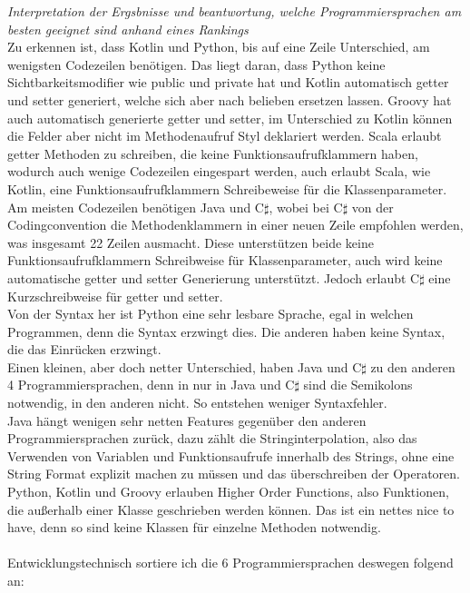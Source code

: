 \documentclass[ngerman]{article}
\begin{document}
    \textit{Interpretation der Ergsbnisse und beantwortung, welche Programmiersprachen am besten geeignet sind anhand eines Rankings}\\
    Zu erkennen ist, dass Kotlin und Python, bis auf eine Zeile Unterschied, am wenigsten Codezeilen benötigen. Das liegt daran, dass Python keine Sichtbarkeitsmodifier wie public und private hat und Kotlin automatisch getter und setter generiert, welche sich aber nach belieben ersetzen lassen. Groovy hat auch automatisch generierte getter und setter, im Unterschied zu Kotlin können die Felder aber nicht im Methodenaufruf Styl deklariert werden. Scala erlaubt getter Methoden zu schreiben, die keine Funktionsaufrufklammern haben, wodurch auch wenige Codezeilen eingespart werden, auch erlaubt Scala, wie Kotlin, eine Funktionsaufrufklammern Schreibeweise für die Klassenparameter. Am meisten Codezeilen benötigen Java und C$\sharp$, wobei bei C$\sharp$ von der Codingconvention die Methodenklammern in einer neuen Zeile empfohlen werden, was insgesamt 22 Zeilen ausmacht. Diese unterstützen beide keine Funktionsaufrufklammern Schreibweise für Klassenparameter, auch wird keine automatische getter und setter Generierung unterstützt. Jedoch erlaubt C$\sharp$ eine Kurzschreibweise für getter und setter.\\
    Von der Syntax her ist Python eine sehr lesbare Sprache, egal in welchen Programmen, denn die Syntax erzwingt dies. Die anderen haben keine Syntax, die das Einrücken erzwingt.\\
    Einen kleinen, aber doch netter Unterschied, haben Java und C$\sharp$ zu den anderen 4 Programmiersprachen, denn in nur in Java und C$\sharp$ sind die Semikolons notwendig, in den anderen nicht. So entstehen weniger Syntaxfehler.\\
    Java hängt wenigen sehr netten Features gegenüber den anderen Programmiersprachen zurück, dazu zählt die Stringinterpolation, also das Verwenden von Variablen und Funktionsaufrufe innerhalb des Strings, ohne eine String Format explizit machen zu müssen und das überschreiben der Operatoren.\\
    Python, Kotlin und Groovy erlauben Higher Order Functions, also Funktionen, die außerhalb einer Klasse geschrieben werden können. Das ist ein nettes nice to have, denn so sind keine Klassen für einzelne Methoden notwendig.\\\\
    Entwicklungstechnisch sortiere ich die 6 Programmiersprachen deswegen folgend an:\\
\end{document}
